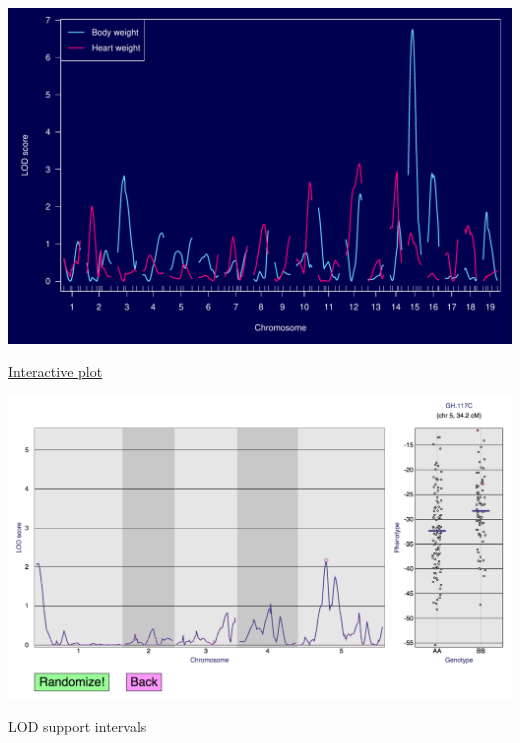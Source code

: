 \documentclass[12pt]{article}
\newcommand{\headsize}{\fontsize{35}{35} \selectfont}
\begin{document}
\centerline{\includegraphics{FigsA/alod.pdf}}


\newpage

\headsize \color{myyellow}
\hfill \begin{minipage}{5.75in}
\centering
\href{http://www.biostat.wisc.edu/~kbroman/D3/lod_random/}{Interactive plot}
\end{minipage}

\vspace{2cm}

\centerline{\href{http://www.biostat.wisc.edu/~kbroman/D3/lod_random}{\includegraphics[width=10in]{FigsA/interactive_perm_test.png}}}

\vspace*{1cm}




\newpage

\headsize \color{myyellow}
\hfill \begin{minipage}{5.75in}
\centering
LOD support intervals
\end{minipage}
\end{document}
